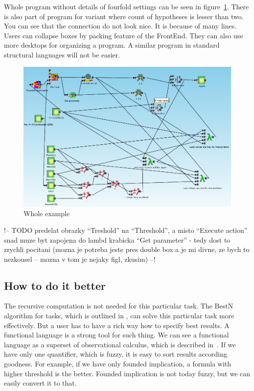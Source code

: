 \documentclass[a4paper,12pt]{book}
\begin{document}
Whole program without details of fourfold settings can be seen in figure~\ref{fig:exampleResult}. There is also part of program for variant where count of hypotheses is lesser than two. You can see that the connection do not look nice. It is because of many lines. Users can collapse boxes by packing feature of the FrontEnd. They can also use more desktops for organizing a program. A similar program in standard structural languages will not be easier.

\begin{figure}
	\includegraphics[width=1\textwidth]{exampleResult}
	\caption{Whole example}
	\label{fig:exampleResult}
\end{figure}

!-- TODO predelat obrazky ``Treshold'' na ``Threshold'', a misto ``Execute action'' snad muze byt zapojena do lambd krabicka ``Get parameter'' - tedy dost to zrychli pocitani (mozna je potreba jeste pres double box a je mi divne, ze bych to nezkousel -- mozna v tom je nejaky figl, zkusim) --!

\subsection{How to do it better}
The recursive computation is not needed for this particular task. The BestN algorithm for tasks, which is outlined in \cite{thesisKuchar}, can solve this particular task more effectively. But a user has to have a rich way how to specify best results. A functional language is a strong tool for such thing. We can see a functional language as a superset of observational calculus, which is described in~\cite{GUHAbook}. If we have only one quantifier, which is fuzzy, it is easy to sort results according goodness. For example, if we have only founded implication, a formula with higher threshold is the better. Founded implication is not today fuzzy, but we can easily convert it to that.
\end{document}
